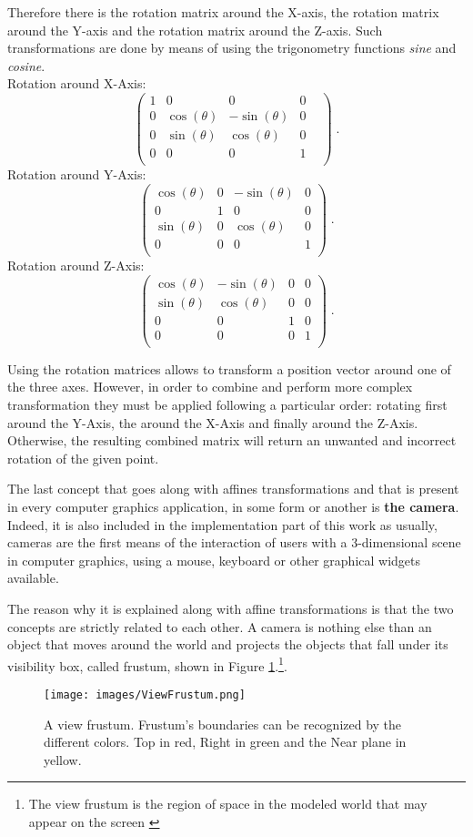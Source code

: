 \documentclass[12pt,a4paper]{extarticle}
\newcommand{\linespace}{\vspace{8pt}}
\begin{document}
Therefore there is the rotation matrix around the X-axis, the rotation matrix around the Y-axis and the rotation matrix around the Z-axis. Such transformations are done by means of using the trigonometry functions \textit{sine} and \textit{cosine}.\\
Rotation around X-Axis:
\[
\begin{pmatrix}
1&0&0&0&\\
0&\cos(\theta)& -\sin(\theta) & 0\\
0&\sin(\theta)&\cos(\theta)&0\\
0&0&0&1\\
\end{pmatrix}
\;.
\] 
Rotation around Y-Axis:
\[
\begin{pmatrix}
\cos(\theta) & 0 &-\sin(\theta)& 0\\
0&1&0&0\\
\sin(\theta)&0&\cos(\theta)&0\\
0&0&0&1\\
\end{pmatrix}
\;.
\]
Rotation around Z-Axis:
\[
\begin{pmatrix}
\cos(\theta)& -\sin(\theta) & 0 & 0\\
\sin(\theta)&\cos(\theta)&0&0\\
0&0&1&0\\
0&0&0&1\\
\end{pmatrix}
\;.
\]


Using the rotation matrices allows to transform a position vector around one of the three axes. However, in order to combine and perform more complex transformation they must be applied following a particular order: rotating first around the Y-Axis, the around the X-Axis and finally around the Z-Axis. Otherwise, the resulting combined matrix will return an unwanted and incorrect rotation of the given point.
\linespace

The last concept that goes along with affines transformations and that is present in every computer graphics application, in some form or another is \textbf{the camera}. Indeed, it is also included in the implementation part of this work as usually, cameras are the first means of the interaction of users with a 3-dimensional scene in computer graphics, using a mouse, keyboard or other graphical widgets available.
\linespace

The reason why it is explained along with affine transformations is that the two concepts are strictly related to each other. A camera is nothing else than an object that moves around the world and projects the objects that fall under its visibility box, called frustum, shown in Figure \ref{fig:viewfrustum}.\footnote{The view frustum is the region of space in the modeled world that may appear on the screen \cite{wiki_frustum:1}}.
\begin{figure}[hbtp]
\centering
\texttt{[image: images/ViewFrustum.png]}
\caption{A view frustum. Frustum's boundaries can be recognized by the different colors. Top in red, Right in green and the Near plane in yellow. }
\label{fig:viewfrustum}
\end{figure}
\end{document}
